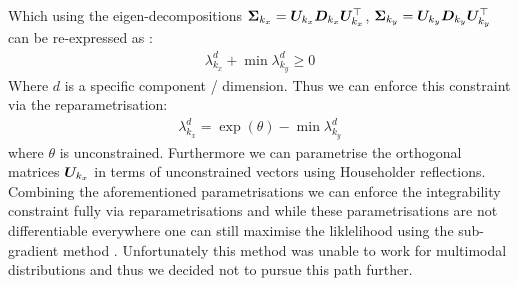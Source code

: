 \documentclass[a4paper,12pt,twoside,openright]{report}
\theoremstyle{definition}
\begin{document}
Which using the eigen-decompositions ${\bm{\Sigma}}_{k_x}={\bm{U}}_{k_x} {\bm{D}}_{k_x} {\bm{U}}^{\top}_{k_x}$,  ${\bm{\Sigma}}_{k_y}={\bm{U}}_{k_y} {\bm{D}}_{k_y} {\bm{U}}^{\top}_{k_y}$ can be re-expressed as : 
\begin{align*}
  \lambda_{k_x}^d + \min\lambda_{k_y}^d \geq 0 
\end{align*}
Where $d$ is a specific component / dimension. Thus we can enforce this constraint via the reparametrisation:
\begin{align*}
   \lambda_{k_x}^d = \exp(\theta) - \min\lambda_{k_y}^d 
\end{align*}
where  $\theta$ is unconstrained. Furthermore we can parametrise the orthogonal matrices ${\bm{U}}_{k_x}$ in terms of unconstrained vectors using Householder reflections. Combining the aforementioned parametrisations we can enforce the integrability constraint fully via reparametrisations and while these parametrisations are not differentiable everywhere one can still maximise the liklelihood using the sub-gradient method \citep{shor1991development}. Unfortunately this method was unable to work for multimodal distributions and thus we decided not to pursue this path further.


 
 
\end{document}
